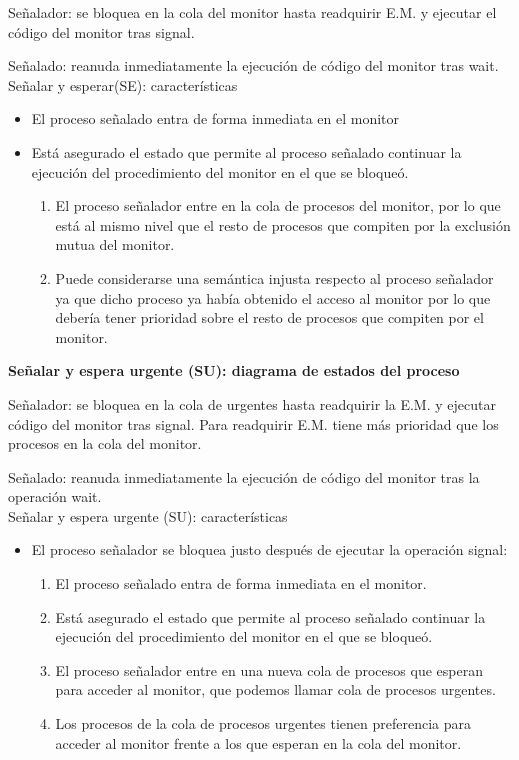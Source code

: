 \documentclass[a4paper,11pt]{article}
\begin{document}
Señalador: se bloquea en la cola del monitor hasta readquirir E.M. y ejecutar el código del monitor tras signal.

Señalado: reanuda inmediatamente la ejecución de código del monitor tras wait. \\

Señalar y esperar(SE): características

\begin{itemize}
\item El proceso señalado entra de forma inmediata en el monitor
\item Está asegurado el estado que permite al proceso señalado continuar la ejecución del procedimiento del monitor en el que se bloqueó. 

	\begin{enumerate}
		\item El proceso señalador entre en la cola de procesos del monitor, por lo que está al mismo nivel que el resto de procesos que compiten por la exclusión mutua del monitor.
		\item Puede considerarse una semántica injusta respecto al proceso señalador ya que dicho proceso ya había obtenido el acceso al monitor por lo que debería tener prioridad sobre el resto de procesos que compiten por el monitor.
	\end{enumerate}
\end{itemize}

\textbf{Señalar y espera urgente (SU): diagrama de estados del proceso}

Señalador: se bloquea en la cola de urgentes hasta readquirir la E.M. y ejecutar código del monitor tras signal. Para readquirir E.M. tiene más prioridad que los procesos en la cola del monitor.

Señalado: reanuda inmediatamente la ejecución de código del monitor tras la operación wait. \\

Señalar y espera urgente (SU): características

\begin{itemize}
\item El proceso señalador se bloquea justo después de ejecutar la operación signal:
	
	\begin{enumerate}
		\item El proceso señalado entra de forma inmediata en el monitor.
		\item Está asegurado el estado que permite al proceso señalado continuar la ejecución del procedimiento del monitor en el que se bloqueó.
		\item El proceso señalador entre en una nueva cola de procesos que esperan para acceder al monitor, que podemos llamar cola de procesos urgentes.
		\item Los procesos de la cola de procesos urgentes tienen preferencia para acceder al monitor frente a los que esperan en la cola del monitor.
	\end{enumerate}
\end{itemize}
\end{document}
